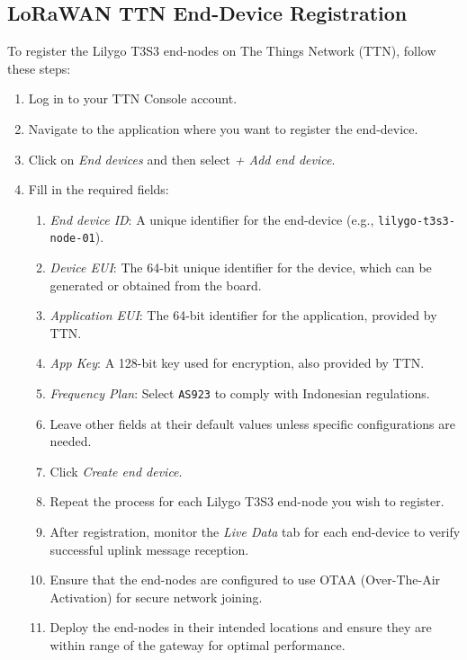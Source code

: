 \subsection{LoRaWAN TTN End-Device Registration}
To register the Lilygo T3S3 end-nodes on The Things Network (TTN), follow these steps:
\begin{enumerate}
    \item Log in to your TTN Console account.
    \item Navigate to the application where you want to register the end-device.
    \item Click on \textit{End devices} and then select \textit{+ Add end device}.
    \item Fill in the required fields:
          \begin{enumerate}
              \item \textit{End device ID}: A unique identifier for the end-device (e.g., \texttt{lilygo-t3s3-node-01}).
              \item \textit{Device EUI}: The 64-bit unique identifier for the device, which can be generated or obtained from the board.
              \item \textit{Application EUI}: The 64-bit identifier for the application, provided by TTN.
              \item \textit{App Key}: A 128-bit key used for encryption, also provided by TTN.
              \item \textit{Frequency Plan}: Select \texttt{AS923} to comply with Indonesian regulations.
              \item Leave other fields at their default values unless specific configurations are needed.
              \item Click \textit{Create end device}.
              \item Repeat the process for each Lilygo T3S3 end-node you wish to register.
              \item After registration, monitor the \textit{Live Data} tab for each end-device to verify successful uplink message reception.
              \item Ensure that the end-nodes are configured to use OTAA (Over-The-Air Activation) for secure network joining.
              \item Deploy the end-nodes in their intended locations and ensure they are within range of the gateway for optimal performance.
          \end{enumerate}
\end{enumerate}

